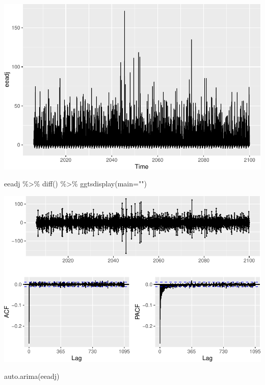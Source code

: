 \documentclass[
  paper=a4,
  ,captions=tableheading
]{scrartcl}
\newenvironment{Shaded}{\begin{snugshade}}{\end{snugshade}}
\newcommand{\AttributeTok}[1]{\textcolor[rgb]{0.77,0.63,0.00}{#1}}
\newcommand{\FunctionTok}[1]{\textcolor[rgb]{0.00,0.00,0.00}{#1}}
\newcommand{\NormalTok}[1]{#1}
\newcommand{\SpecialCharTok}[1]{\textcolor[rgb]{0.00,0.00,0.00}{#1}}
\newcommand{\StringTok}[1]{\textcolor[rgb]{0.31,0.60,0.02}{#1}}
\begin{document}
\includegraphics{Haskell_files/figure-latex/unnamed-chunk-86-1.pdf}

\begin{Shaded}
\begin{Highlighting}[]
\NormalTok{eeadj }\SpecialCharTok{\%\textgreater{}\%} \FunctionTok{diff}\NormalTok{() }\SpecialCharTok{\%\textgreater{}\%} \FunctionTok{ggtsdisplay}\NormalTok{(}\AttributeTok{main=}\StringTok{""}\NormalTok{)}
\end{Highlighting}
\end{Shaded}

\includegraphics{Haskell_files/figure-latex/unnamed-chunk-87-1.pdf}

\begin{Shaded}
\begin{Highlighting}[]
\FunctionTok{auto.arima}\NormalTok{(eeadj)}
\end{Highlighting}
\end{Shaded}
\end{document}
